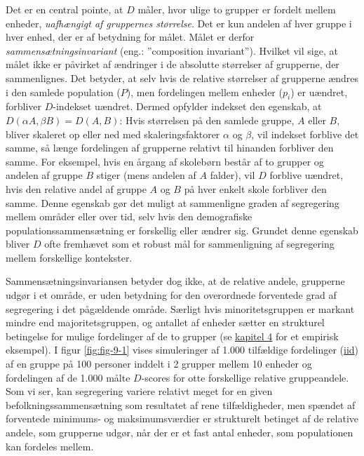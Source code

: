 \documentclass[
]{book}
\begin{document}
Det er en central pointe, at \(D\) måler, hvor ulige to grupper er fordelt mellem enheder, \emph{uafhængigt af gruppernes størrelse}. Det er kun andelen af hver gruppe i hver enhed, der er af betydning for målet. Målet er derfor \emph{sammensætningsinvariant} (eng.: ''composition invariant''). Hvilket vil sige, at målet ikke er påvirket af ændringer i de absolutte størrelser af grupperne, der sammenlignes. Det betyder, at selv hvis de relative størrelser af grupperne ændres i den samlede population (\(P\)), men fordelingen mellem enheder (\(p_{i}\)) er uændret, forbliver \(D\)-indekset uændret. Dermed opfylder indekset den egenskab, at \(D \left( \alpha A, \beta B \right) = D \left( A, B \right)\): Hvis størrelsen på den samlede gruppe, \(A\) eller \(B\), bliver skaleret op eller ned med skaleringsfaktorer \(\alpha\) og \(\beta\), vil indekset forblive det samme, så længe fordelingen af grupperne relativt til hinanden forbliver den samme. For eksempel, hvis en årgang af skolebørn består af to grupper og andelen af gruppe \(B\) stiger (mens andelen af \(A\) falder), vil \(D\) forblive uændret, hvis den relative andel af gruppe \(A\) og \(B\) på hver enkelt skole forbliver den samme. Denne egenskab gør det muligt at sammenligne graden af segregering mellem områder eller over tid, selv hvis den demografiske populationssammensætning er forskellig eller ændrer sig. Grundet denne egenskab bliver \(D\) ofte fremhævet som et robust mål for sammenligning af segregering mellem forskellige kontekster.

Sammensætningsinvariansen betyder dog ikke, at de relative andele, grupperne udgør i et område, er uden betydning for den overordnede forventede grad af segregering i det pågældende område. Særligt hvis minoritetsgruppen er markant mindre end majoritetsgruppen, og antallet af enheder sætter en strukturel betingelse for mulige fordelinger af de to grupper (se \hyperref[kap4]{kapitel 4} for et empirisk eksempel). I figur \ref{fig:fig-9-1} vises simuleringer af 1.000 tilfældige fordelinger (\href{https://en.wikipedia.org/wiki/Independent_and_identically_distributed_random_variables}{iid}) af en gruppe på 100 personer inddelt i 2 grupper mellem 10 enheder og fordelingen af de 1.000 målte \(D\)-scores for otte forskellige relative gruppeandele. Som vi ser, kan segregering variere relativt meget for en given befolkningssammensætning som resultatet af rene tilfældigheder, men spændet af forventede minimums- og maksimumsværdier er strukturelt betinget af de relative andele, som grupperne udgør, når der er et fast antal enheder, som populationen kan fordeles mellem.
\end{document}
